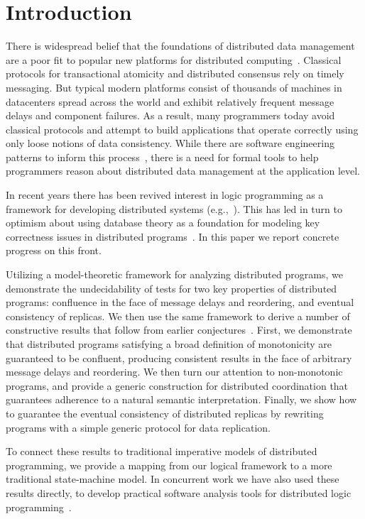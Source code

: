\section{Introduction}

There is widespread belief that the foundations of distributed data management
are a poor fit to popular new platforms for distributed
computing~\cite{ladis}. Classical protocols for transactional atomicity and
distributed consensus rely on timely messaging. But typical modern platforms
consist of thousands of machines in datacenters spread across the world and
exhibit relatively frequent message delays and component failures.  As a result,
many programmers today avoid classical protocols and attempt to build
applications that operate correctly using only loose notions of data
consistency.  While there are software engineering patterns to inform this
process~\cite{quicksand}, there is a need for formal tools to help programmers
reason about distributed data management at the application level.

In recent years there has been revived interest in logic programming as a framework for developing distributed systems (e.g.,~\cite{reactors,boom}).  This has led in turn to optimism about using database theory as a foundation for modeling key correctness issues in distributed programs~\cite{declarative-imperative}.
In this paper we report concrete progress on this front.  

Utilizing a model-theoretic framework for analyzing distributed programs, we demonstrate the undecidability of tests for two key properties of distributed programs: confluence in the face of message delays and reordering, and eventual consistency of replicas.  We then use the same framework to derive a number of constructive results that follow from earlier conjectures~\cite{declarative-imperative}.
First, we demonstrate that distributed programs satisfying a broad definition of  monotonicity are guaranteed to be confluent, producing consistent results in the face of arbitrary message delays and reordering.  We then turn our attention to non-monotonic programs, and provide a generic construction for distributed coordination that guarantees adherence to a natural semantic interpretation.  Finally, we show how to guarantee the eventual consistency of distributed replicas by rewriting programs with a simple generic protocol for data replication.

To connect these results to traditional imperative models of distributed programming, we provide a mapping from our logical framework to a more traditional state-machine model.  In concurrent work we have also used these results directly, to develop practical software analysis tools for distributed logic programming~\cite{cidr11}.  

